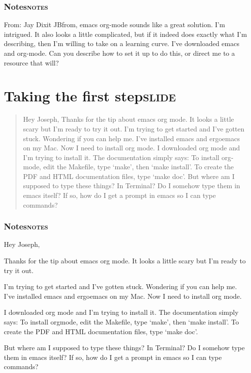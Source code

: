 \documentclass[11pt]{article}
\begin{document}
\subsubsection{Notes\hfill{}\textsc{notes}}
\label{sec:orgheadline27}
From: Jay Dixit 
JBfrom, emacs org-mode sounds like a great solution. I'm intrigued. It also looks a little complicated, but if it indeed does exactly what I'm describing, then I'm willing to take on a learning curve. I've downloaded emacs and org-mode. Can you describe how to set it up to do this, or direct me to a resource that will? 


\section{Taking the first step\hfill{}\textsc{slide}}
\label{sec:orgheadline30}
\begin{quote}
Hey Joseph, 
Thanks for the tip about emacs org mode. It looks a little scary but I'm ready to try it out. 
I'm trying to get started and I've gotten stuck. Wondering if you can help me.
I've installed emacs and ergoemacs on my Mac. Now I need to install org mode. 
I downloaded org mode and I'm trying to install it. The documentation simply says:
To install org­mode, edit the Makefile, type `make', then `make install'.
To create the PDF and HTML documentation files, type `make doc'. 
But where am I supposed to type these things? In Terminal? Do I somehow type them in emacs itself? If so, how do I get a prompt in emacs so I can type commands? 
\end{quote}

\subsubsection{Notes\hfill{}\textsc{notes}}
\label{sec:orgheadline29}
Hey Joseph,

Thanks for the tip about emacs org mode. It looks a little scary but I'm ready to try it out.

I'm trying to get started and I've gotten stuck. Wondering if you can help me.
I've installed emacs and ergoemacs on my Mac. Now I need to install org mode.

I downloaded org mode and I'm trying to install it. The documentation simply says:
To install org­mode, edit the Makefile, type `make', then `make install'.
To create the PDF and HTML documentation files, type `make doc'.

But where am I supposed to type these things? In Terminal? Do I somehow type them in emacs itself? If so, how do I get a prompt in emacs so I can type commands? 
\end{document}

